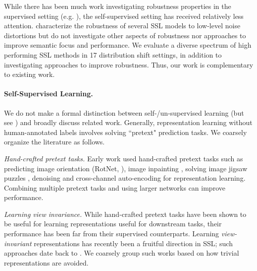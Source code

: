 \documentclass[twoside,11pt]{article}
\begin{document}
While there has been much work investigating robustness properties in the supervised setting (e.g. \citet{xiao2020noise, hendrycks2019nae, hendrycks_many_2021, goodfellow_fgsm}), the self-supervised setting has received relatively less attention. \citet{geirhos2020surprising} characterize the robustness of several SSL models to low-level noise distortions but do not investigate other aspects of robustness nor approaches to improve semantic focus and performance. We evaluate a diverse spectrum of high performing SSL methods in 17 distribution shift settings, in addition to investigating approaches to improve robustness. Thus, our work is complementary to existing work.


\paragraph{Self-Supervised Learning.} We do not make a formal distinction between self-/un-supervised learning (but see \citet{ssl_review}) and broadly discuss  related work. Generally, representation learning without human-annotated labels involves solving ``pretext" prediction tasks. We coarsely organize the literature as follows.

\textit{ Hand-crafted pretext tasks.} Early work used hand-crafted pretext tasks such as predicting image orientation (RotNet, \citet{gidaris2018unsupervised}), image inpainting \citep{inpainting_ssl}, solving image jigsaw puzzles \citep{jigsaw_ssl}, denoising \citep{vincent_extracting_2008} and cross-channel \citep{colorization_ssl, split-brain_2017} auto-encoding for representation learning. Combining multiple pretext tasks \citep{doersch_multi-task_2017} and using larger networks \citep{kolesnikov_revisiting_2019} can improve performance.

 \textit{Learning view invariance.} While hand-crafted pretext tasks have been shown to be useful for learning representations useful for downstream tasks, their performance has been far from their supervised counterparts. Learning \textit{view-invariant} representations has recently been a fruitful direction in SSL; such approaches date back to \citet{becker_self-organizing_1992}. We coarsely group such works based on how trivial representations are avoided. 
\end{document}

